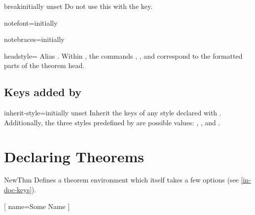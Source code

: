 \documentclass{ltxdoc}
\newcommand{\ttbrackets}[1]{\brackets{\texttt{#1}}}
\begin{document}
\begin{docKey}{break}{}{initially unset}
Do not use this with the  key.
\end{docKey}

\begin{docKey}{notefont}{=}{initially }

\end{docKey}

\begin{docKey}{notebraces}{=}{initially \ttbrackets{(}\ttbrackets{)}}

\end{docKey}

\begin{docKey}{headstyle}{=\textbar{}\textbar{}}{}
Alias . Within , the commands , , and  correspond to the formatted parts of the theorem head.
\end{docKey}

\subsection{Keys added by }

\begin{docKey}{inherit-style}{=}{initially unset}
Inherit the keys of any style declared with . Additionally, the three styles predefined by  are possible values: , , and .
\end{docKey}

\section{Declaring Theorems}

\begin{docCommand}{NewThm}{}
Defines a theorem environment  which itself takes a few options (see \autoref{in-doc-keys}).
\end{docCommand}

\begin{tcbwritetemp}
[
    name=Some Name
    ]
\end{tcbwritetemp}
\end{document}
